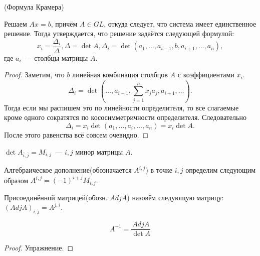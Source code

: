 \begin{follow}
     (Формула Крамера)

     Решаем $Ax = b$, причём $A\in GL$, откуда следует, что система имеет единственное решение.
     Тогда утверждается, что решение задаётся следующей формулой:
    \[
        x_i = \frac{\Delta_i}{\Delta}, \Delta = \det A, 
        \Delta_i = \det\left(a_1, \dots, a_{i-1}, b, a_{i+1},\dots, a_n\right)   
    ,\] где $a_i$~--- столбцы матрицы $A$.
\end{follow}
\begin{proof}
    Заметим, что $b$ линейная комбинация столбцов $A$ с коэффициентами $x_i$.
    \[
        \Delta_i = \det\left(\dots,a_{i-1}, \sum\limits_{j=1}^{n}{x_ja_j}, a_{i+1},\dots\right)
    .\]
    Тогда если мы распишем это по линейности определителя, то все слагаемые 
    кроме одного сократятся по кососимметричности определителя. Следовательно
    \[
        \Delta_i = x_i\det\left(a_1,\dots,a_i,\dots, a_n\right) = x_i\det A
    .\]
    После этого равенства всё совсем очевидно. 
\end{proof}
\begin{definition}
    $\det A_{\overline{i},\overline{j}} = M_{i,j}$~--- $i,j$ минор матрицы $A$.
\end{definition}
\begin{definition}
    Алгебраическое дополнение(обозначается $A^{i,j}$) в точке $i, j$ определим следующим
    образом $A^{i,j} = (-1)^{i + j}M_{i,j}$. 
\end{definition}
\begin{definition}
    Присоединённой матрицей(обозн. $Adj A$) назовём следующую матрицу:\\ $(Adj A)_{i,j} = A^{j,i}$.
\end{definition}
\begin{statement}
    \[
        A^{-1} = \frac{AdjA}{\det A}
    \]
\end{statement}
\begin{proof}
    Упражнение.
\end{proof}
